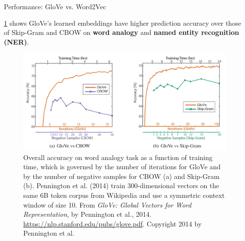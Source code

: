\begin{frame}{Performance: GloVe vs. Word2Vec}
    
    \cref{fig:gloveVsWord2vec} shows GloVe's learned embeddings have higher prediction accuracy over those of Skip-Gram and CBOW on \textbf{word analogy} and \textbf{named entity recognition (NER)}.
    
    \begin{figure}[h]
    \vspace{-5pt}
    \centering
    \includegraphics[width=0.99\textwidth]{imgs/table_gloveVSword2vec.png}
    \vspace{-5pt}
    \caption{\tiny Overall accuracy on word analogy task as a function of training time, which is governed by the number of iterations for GloVe and by the number of  negative samples for CBOW (a) and Skip-Gram (b). Pennington et al. (2014) train 300-dimensional vectors on the same 6B token corpus from Wikipedia and use a symmetric context window of size 10. From \emph{GloVe: Global Vectors for Word Representation}, by Pennington et al., 2014. \url{https://nlp.stanford.edu/pubs/glove.pdf}. Copyright 2014 by Pennington et al.}
    \vspace{-5pt}
    \label{fig:gloveVsWord2vec}
    \end{figure}
\end{frame}